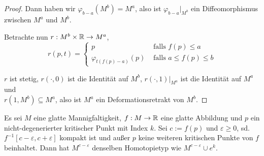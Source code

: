 \begin{proof}
    Dann haben wir $\varphi_{b - a} (M^b) = M^a$, also ist $\varphi_{b - a}|_{M^b}$ ein 
    Diffeomorphismus zwischen $M^a$ und $M^b$. 

    Betrachte nun $r: M^b \times { \mathbb R } \to M^a$,
    \[  
        r(p, t) = \begin{cases}
            p & \text{ falls }  f(p) \leq a \\
            \varphi_{t(f(p) - a)}(p) & \text{ falls } a \leq f(p) \leq b 
        \end{cases}
    \]

    $r$ ist stetig, $r(\cdot, 0)$ ist die Identität auf $M^b$, $r(\cdot, 1)|_{M^a}$ ist die 
    Identität auf $M^a$ und \\ $r(1, M^b) \subseteq M^a$, also ist $M^a$ ein Deformationsretrakt 
    von 
    $M^b$.
\end{proof}

\begin{theorem}
    \label{satz: zweites deformationslemma}
    Es sei $M$ eine glatte Mannigfaltigkeit, $f: M \rightarrow { \mathbb R }$ eine glatte
    Abbildung und $p$ ein nicht-degenerierter kritischer Punkt mit Index 
    $k$. Sei $c := f(p)$ und $\varepsilon \geq 0$, sd. 
    $f^{-1}[c - \varepsilon, c + \varepsilon]$ kompakt ist und außer $p$ keine 
    weiteren kritischen Punkte von $f$ beinhaltet. Dann hat $M^{c-\varepsilon}$
    denselben Homotopietyp wie $M^{c - \varepsilon} \cup e^k$.
\end{theorem}

